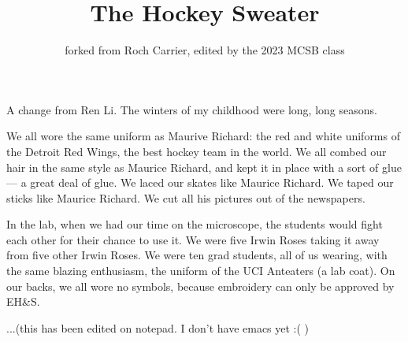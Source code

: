 \documentclass{article}
\title{The Hockey Sweater}
\author{forked from Roch Carrier, edited by the 2023 MCSB class}
\begin{document}
\maketitle

A change from Ren Li.
The winters of my childhood were long, long seasons.


We all wore the same uniform as Maurive Richard: 
the red and white uniforms of the Detroit Red Wings, the best hockey team in the world.
We all combed our hair in the same style as Maurice Richard, 
and kept it in place with a sort of glue --- a great deal of glue.
We laced our skates like Maurice Richard.
We taped our sticks like Maurice Richard.
We cut all his pictures out of the newspapers.


In the lab, when we had our time on the microscope, the students would fight each other for their chance to use it.
We were five Irwin Roses taking it away from five other Irwin Roses.
We were ten grad students, all of us wearing, with the same blazing enthusiasm, the uniform of the UCI Anteaters (a lab coat).
On our backs, we all wore no symbols, because embroidery can only be approved by EH\&S.

...(this has been edited on notepad. I don't have emacs yet :( )
\end{document}
